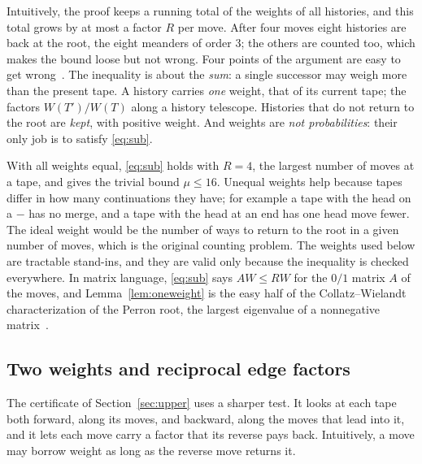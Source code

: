 Intuitively, the proof keeps a running total of the weights of all histories, and this total grows by at most a
factor $R$ per move. After four moves eight histories are back at the root, the eight meanders of order $3$; the
others are counted too, which makes the bound loose but not wrong. Four points of the argument are easy to get
wrong~\cite{BoundsPaper}. The inequality is about the \emph{sum}: a single successor may weigh more than the present
tape. A history carries \emph{one} weight, that of its current tape; the factors $W(T')/W(T)$ along a history
telescope. Histories that do not return to the root are \emph{kept}, with positive weight. And weights are \emph{not
probabilities}: their only job is to satisfy \eqref{eq:sub}.

With all weights equal, \eqref{eq:sub} holds with $R=4$, the largest number of moves at a tape, and gives the trivial
bound $\mu\le16$. Unequal weights help because tapes differ in how many continuations they have; for example a tape
with the head on a $-$ has no merge, and a tape with the head at an end has one head move fewer. The ideal weight would
be the number of ways to return to the root in a given number of moves, which is the original counting problem. The
weights used below are tractable stand-ins, and they are valid only because the inequality is checked everywhere. In
matrix language, \eqref{eq:sub} says $AW\le RW$ for the $0/1$ matrix $A$ of the moves, and
Lemma~\ref{lem:oneweight} is the easy half of the Collatz--Wielandt characterization of the Perron root, the largest
eigenvalue of a nonnegative matrix~\cite{Seneta}.


\subsection{Two weights and reciprocal edge factors}

The certificate of Section~\ref{sec:upper} uses a sharper test. It looks at each tape both forward, along its moves,
and backward, along the moves that lead into it, and it lets each move carry a factor that its reverse pays back.
Intuitively, a move may borrow weight as long as the reverse move returns it.

